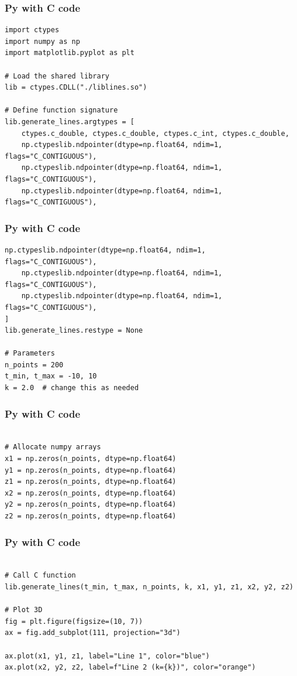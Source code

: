 \documentclass{beamer}
\begin{document}
\begin{frame}[fragile]
    \frametitle{Py with C code}
    \begin{lstlisting}
import ctypes
import numpy as np
import matplotlib.pyplot as plt

# Load the shared library
lib = ctypes.CDLL("./liblines.so")

# Define function signature
lib.generate_lines.argtypes = [
    ctypes.c_double, ctypes.c_double, ctypes.c_int, ctypes.c_double,
    np.ctypeslib.ndpointer(dtype=np.float64, ndim=1, flags="C_CONTIGUOUS"),
    np.ctypeslib.ndpointer(dtype=np.float64, ndim=1, flags="C_CONTIGUOUS"),
    np.ctypeslib.ndpointer(dtype=np.float64, ndim=1, flags="C_CONTIGUOUS"),
     \end{lstlisting}
\end{frame}
\begin{frame}[fragile]
    \frametitle{Py with C code}
    \begin{lstlisting}
np.ctypeslib.ndpointer(dtype=np.float64, ndim=1, flags="C_CONTIGUOUS"),
    np.ctypeslib.ndpointer(dtype=np.float64, ndim=1, flags="C_CONTIGUOUS"),
    np.ctypeslib.ndpointer(dtype=np.float64, ndim=1, flags="C_CONTIGUOUS"),
]
lib.generate_lines.restype = None

# Parameters
n_points = 200
t_min, t_max = -10, 10
k = 2.0  # change this as needed
 \end{lstlisting}
\end{frame}
\begin{frame}[fragile]
    \frametitle{Py with C code}
    \begin{lstlisting}

# Allocate numpy arrays
x1 = np.zeros(n_points, dtype=np.float64)
y1 = np.zeros(n_points, dtype=np.float64)
z1 = np.zeros(n_points, dtype=np.float64)
x2 = np.zeros(n_points, dtype=np.float64)
y2 = np.zeros(n_points, dtype=np.float64)
z2 = np.zeros(n_points, dtype=np.float64)
 \end{lstlisting}
\end{frame}
\begin{frame}[fragile]
    \frametitle{Py with C code}
    \begin{lstlisting}

# Call C function
lib.generate_lines(t_min, t_max, n_points, k, x1, y1, z1, x2, y2, z2)

# Plot 3D
fig = plt.figure(figsize=(10, 7))
ax = fig.add_subplot(111, projection="3d")

ax.plot(x1, y1, z1, label="Line 1", color="blue")
ax.plot(x2, y2, z2, label=f"Line 2 (k={k})", color="orange")
 \end{lstlisting}
\end{frame}
\end{document}
